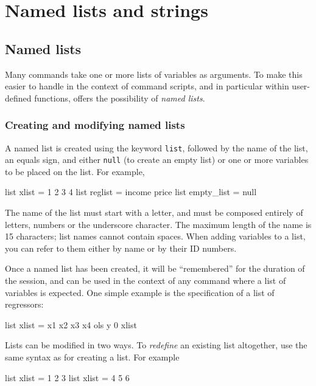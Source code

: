 \chapter{Named lists and strings}
\label{chap-persist}


\section{Named lists}
\label{named-lists}

Many  commands take one or more lists of variables as
arguments.  To make this easier to handle in the context of command
scripts, and in particular within user-defined functions, 
offers the possibility of \textit{named lists}.  

\subsection{Creating and modifying named lists}

A named list is created using the keyword \texttt{list}, followed by
the name of the list, an equals sign, and either \texttt{null} (to
create an empty list) or one or more variables to be placed on the
list.  For example,
%
\begin{code}
list xlist = 1 2 3 4
list reglist = income price 
list empty_list = null
\end{code}

The name of the list must start with a letter, and must be composed
entirely of letters, numbers or the underscore character.  The maximum
length of the name is 15 characters; list names cannot contain
spaces.  When adding variables to a list, you can refer to them either
by name or by their ID numbers. 

Once a named list has been created, it will be ``remembered'' for the
duration of the  session, and can be used in the context of
any  command where a list of variables is expected.  One
simple example is the specification of a list of regressors:
%
\begin{code}
list xlist = x1 x2 x3 x4
ols y 0 xlist
\end{code}

Lists can be modified in two ways.  To \textit{redefine} an existing
list altogether, use the same syntax as for creating a list.  For
example
%
\begin{code}
list xlist = 1 2 3
list xlist = 4 5 6
\end{code}

